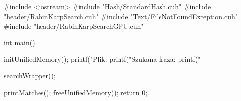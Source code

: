 #include <iostream>
#include "Hash/StandardHash.cuh"
#include "header/RabinKarpSearch.cuh"
#include "Text/FileNotFoundException.cuh"
#include "header/RabinKarpSearchGPU.cuh"

int main()
{
    initUnifiedMemory();
    printf("Plik: %
    printf("Szukana fraza: %
    printf("%

    searchWrapper();

    printMatches();
    freeUnifiedMemory();
    return 0;
}